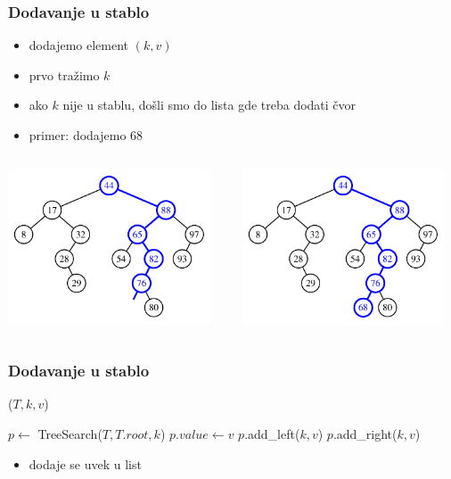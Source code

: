 \documentclass[compress,aspectratio=169]{beamer}
\begin{document}
\begin{frame}[fragile]
  \frametitle{Dodavanje u stablo}
  \begin{itemize}
    \item dodajemo element $(k, v)$
    \item prvo tražimo $k$
    \item ako $k$ nije u stablu, došli smo do lista gde treba dodati čvor
    \item primer: dodajemo 68
  \end{itemize}
  \begin{columns}
    \begin{column}[c]{6cm}
      \begin{center}
        \includegraphics[width=6cm]{asp-11-pic05a.pdf}
      \end{center}
    \end{column}  
    \begin{column}[c]{6cm}
      \begin{center}
        \includegraphics[width=6cm]{asp-11-pic05b.pdf}
      \end{center}
    \end{column}  
  \end{columns}
\end{frame}

\begin{frame}[fragile]
  \frametitle{Dodavanje u stablo}
($T, k, v$)
\begin{algorithmic}
\STATE $p \leftarrow$ TreeSearch($T, T.root, k$)
  \STATE $p.value \leftarrow v$  
  \STATE $p$.add\_left($k, v$) 
\ELSE
  \STATE $p$.add\_right($k, v$) 
\ENDIF
\end{algorithmic}
  \begin{itemize}
    \item dodaje se uvek u list
  \end{itemize}
\end{frame}
\end{document}
